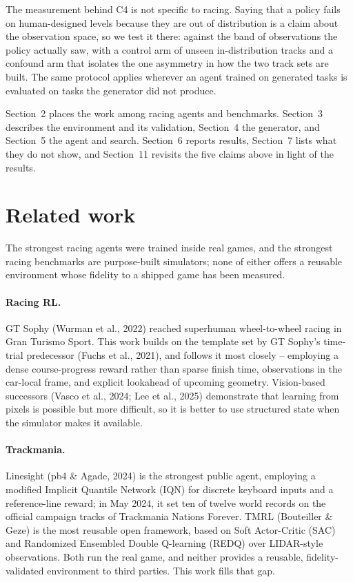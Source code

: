 \documentclass[11pt]{article}
\begin{document}
The measurement behind C4 is not specific to racing. Saying that a policy fails on human-designed levels because they are out of distribution is a claim about the observation space, so we test it there: against the band of observations the policy actually saw, with a control arm of unseen in-distribution tracks and a confound arm that isolates the one asymmetry in how the two track sets are built. The same protocol applies wherever an agent trained on generated tasks is evaluated on tasks the generator did not produce.

Section~2 places the work among racing agents and benchmarks. Section~3 describes the environment and its validation, Section~4 the generator, and Section~5 the agent and search. Section~6 reports results, Section~7 lists what they do not show, and Section~11 revisits the five claims above in light of the results.

\section{Related work}

The strongest racing agents were trained inside real games, and the strongest racing benchmarks are purpose-built simulators; none of either offers a reusable environment whose fidelity to a shipped game has been measured.

\paragraph{Racing RL.} GT Sophy (Wurman et al., 2022) reached superhuman wheel-to-wheel racing in Gran Turismo Sport. This work builds on the template set by GT Sophy's time-trial predecessor (Fuchs et al., 2021), and follows it most closely -- employing a dense course-progress reward rather than sparse finish time, observations in the car-local frame, and explicit lookahead of upcoming geometry. Vision-based successors (Vasco et al., 2024; Lee et al., 2025) demonstrate that learning from pixels is possible but more difficult, so it is better to use structured state when the simulator makes it available.

\paragraph{Trackmania.} Linesight (pb4 \& Agade, 2024) is the strongest public agent, employing a modified Implicit Quantile Network (IQN) for discrete keyboard inputs and a reference-line reward; in May 2024, it set ten of twelve world records on the official campaign tracks of Trackmania Nations Forever. TMRL (Bouteiller \& Geze) is the most reusable open framework, based on Soft Actor-Critic (SAC) and Randomized Ensembled Double Q-learning (REDQ) over LIDAR-style observations. Both run the real game, and neither provides a reusable, fidelity-validated environment to third parties. This work fills that gap.
\end{document}
